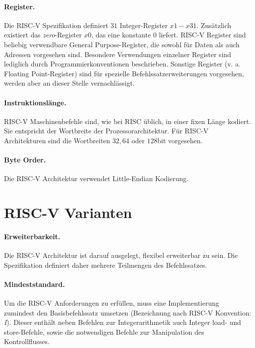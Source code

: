 \paragraph{Register.} Die RISC-V Spezifikation definiert $31$ Integer-Register $x1 - x31$. Zusätzlich existiert das \textit{zero}-Register $x0$, das eine konstante $0$ liefert. RISC-V Register sind beliebig verwendbare General Purpose-Register, die sowohl für Daten als auch Adressen vorgesehen sind. Besondere Verwendungen einzelner Register sind lediglich durch Programmierkonventionen beschrieben. Sonstige Register (v. a. Floating Point-Register) sind für spezielle Befehlssatzerweiterungen vorgesehen, werden aber an dieser Stelle vernachlässigt.

\paragraph{Instruktionslänge.} RISC-V Maschinenbefehle sind, wie bei RISC üblich, in einer fixen Länge kodiert. Sie entspricht der Wortbreite der Prozessorarchitektur. Für RISC-V Architekturen sind die Wortbreiten $32, 64$ oder $128$bit vorgesehen.

\paragraph{Byte Order.} Die RISC-V Architektur verwendet Little-Endian Kodierung.

\section{RISC-V Varianten}
\label{sec:erweiterung}

\paragraph{Erweiterbarkeit.} Die RISC-V Architektur ist darauf ausgelegt, flexibel erweiterbar zu sein. Die Spezifikation definiert daher mehrere Teilmengen des Befehlssatzes. \cite[p. 4]{RISC}

\paragraph{Mindeststandard.} Um die RISC-V Anforderungen zu erfüllen, muss eine Implementierung zumindest den Basisbefehlssatz umsetzen (Bezeichnung nach \mbox{RISC-V} Konvention: \textit{I}). Dieser enthält neben Befehlen zur Integerarithmetik auch Integer load- und store-Befehle, sowie die notwendigen Befehle zur Manipulation des Kontrollflusses.


